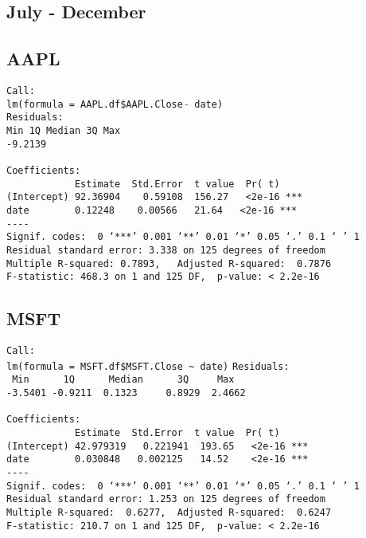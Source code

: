 \documentclass{article}[14pt]
\begin{document}
\subsection{July - December}
\subsection{AAPL}
\texttt{Call: \\
lm(formula = AAPL.df\$AAPL.Close $\tilde{}$ date)\\
Residuals:\\
Min \hspace{35pt} 1Q \qquad Median \qquad 3Q \qquad  Max\\
-9.2139       \\}
\verb| |\\
\verb|Coefficients:|\\
\verb|            Estimate  Std.Error  t value  Pr( t)|\\
\verb|(Intercept) 92.36904    0.59108  156.27   <2e-16 ***|\\
\verb|date        0.12248    0.00566   21.64   <2e-16 ***|\\
\verb|----|\\
\verb|Signif. codes:  0 ‘***’ 0.001 ‘**’ 0.01 ‘*’ 0.05 ‘.’ 0.1 ‘ ’ 1|\\
\verb|Residual standard error: 3.338 on 125 degrees of freedom|\\
\verb|Multiple R-squared: 0.7893,	Adjusted R-squared:  0.7876|\\
\verb|F-statistic: 468.3 on 1 and 125 DF,  p-value: < 2.2e-16|
\subsection{MSFT}
\verb|Call:|\\
\verb|lm(formula = MSFT.df$MSFT.Close ~ date)|
\verb|Residuals:|\\
\verb| Min      1Q      Median      3Q     Max |\\
\verb|-3.5401 -0.9211  0.1323     0.8929  2.4662 |\\
\verb| |\\
\verb|Coefficients:|\\
\verb|            Estimate  Std.Error  t value  Pr( t)|\\
\verb|(Intercept) 42.979319   0.221941  193.65   <2e-16 ***|\\
\verb|date        0.030848   0.002125   14.52    <2e-16 ***|\\
\verb|----|\\
\verb|Signif. codes:  0 ‘***’ 0.001 ‘**’ 0.01 ‘*’ 0.05 ‘.’ 0.1 ‘ ’ 1|\\
\verb|Residual standard error: 1.253 on 125 degrees of freedom|\\
\verb|Multiple R-squared:  0.6277,	Adjusted R-squared:  0.6247|\\
\verb|F-statistic: 210.7 on 1 and 125 DF,  p-value: < 2.2e-16|
\end{document}

